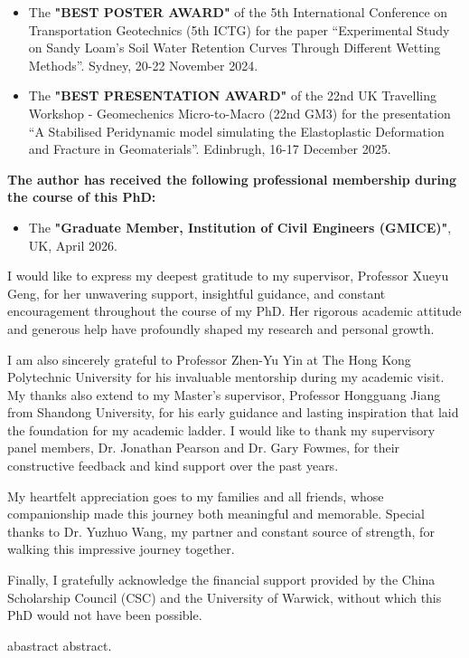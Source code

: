 \begin{itemize}
   \item The \textbf{"BEST POSTER AWARD"} of the 5th International Conference on Transportation Geotechnics (5th ICTG) for the paper “Experimental Study on Sandy Loam’s Soil Water Retention Curves Through Different Wetting Methods”. Sydney, 20-22 November 2024.
   \item The \textbf{"BEST PRESENTATION AWARD"} of the 22nd UK Travelling Workshop - Geomechenics Micro-to-Macro (22nd GM3) for the presentation “A Stabilised Peridynamic model simulating the Elastoplastic Deformation and Fracture in Geomaterials”. Edinbrugh, 16-17 December 2025.
\end{itemize}
\noindent\textbf{The author has received the following professional membership during the course of this PhD:}\par
\begin{itemize}
   \item The \textbf{"Graduate Member, Institution of Civil Engineers (GMICE)"}, UK, April 2026.
\end{itemize}
I would like to express my deepest gratitude to my supervisor, Professor Xueyu Geng, for her unwavering support, insightful guidance, and constant encouragement throughout the course of my PhD. Her rigorous academic attitude and generous help have profoundly shaped my research and personal growth. \par
I am also sincerely grateful to Professor Zhen-Yu Yin at The Hong Kong Polytechnic University for his invaluable mentorship during my academic visit. My thanks also extend to my Master’s supervisor, Professor Hongguang Jiang from Shandong University, for his early guidance and lasting inspiration that laid the foundation for my academic ladder. I would like to thank my supervisory panel members, Dr. Jonathan Pearson and Dr. Gary Fowmes, for their constructive feedback and kind support over the past years.\par
My heartfelt appreciation goes to my families and all friends, whose companionship made this journey both meaningful and memorable. Special thanks to Dr. Yuzhuo Wang, my partner and constant source of strength, for walking this impressive journey together. \par
Finally, I gratefully acknowledge the financial support provided by the China Scholarship Council (CSC) and the University of Warwick, without which this PhD would not have been possible.\par
\clearforchapter\listoffigures
\clearforchapter\listoftables
\printacronyms
abastract abstract. \par